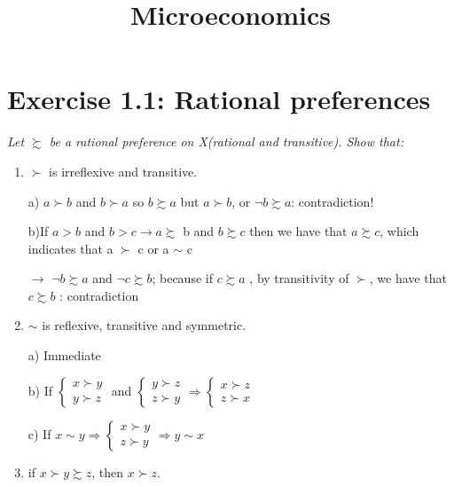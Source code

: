 \documentclass[11pt]{article} %
\title{Microeconomics }
\begin{document}
\maketitle


\section*{Exercise 1.1: Rational preferences }

\textit{Let $\succsim$ be a rational preference on X(rational and transitive). Show that:}











\begin{enumerate} 
 \item $\succ$ is irreflexive and transitive.

a)
$a \succ b$ and  $b\succ a$
so $b \succsim a$ but $a \succ b$, or $\neg b \succsim a$: contradiction!

b)If  $a>b$ 
and $b>c\rightarrow a \succsim$ b 
and $b \succsim c $
then we have that $ a \succsim c$, which indicates that a $\succ$ c or  a $\sim$ c

$\rightarrow$ $\neg b \succsim a$ and $\neg c \succsim  b$; because if $c\succsim a$ , by transitivity of $\succ$, we have that  $c \succsim b$ : contradiction

\item $\sim$ is reflexive, transitive and symmetric.

a) Immediate


b) If $\begin{cases}
x \succ y \\
y \succ z
\end{cases}$ and  
$\begin{cases} 
y \succ z \\
z \succ y 
\end{cases}
\Rightarrow 
\begin{cases}
x \succ z \\
z \succ x
\end{cases}$

c) If $x \sim y\Rightarrow
\begin{cases} 
x \succ y \\
z \succ y
\end{cases} \Rightarrow y \sim x$  

\item if $x \succ y \succsim z$, then $x \succ z$.

\end{enumerate}
\end{document}
